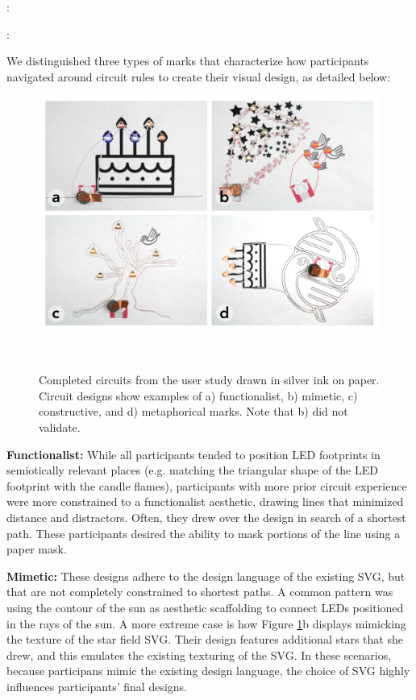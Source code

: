 \documentclass{sigchi}
\begin{document}
  : 
  
  
  : 

  We distinguished three types of marks that characterize how participants navigated around circuit rules to create their visual design, as detailed below:
  
  \begin{figure}[t]
\centering
  \includegraphics[width=1\columnwidth]{figures/users_final_des}
  \caption{Completed circuits from the user study drawn in silver ink on paper. Circuit designs show examples of a) functionalist, b) mimetic, c) constructive, and d) metaphorical marks. Note that b) did not validate.}~\label{fig:user-artwork}
  \vspace{-20pt}
\end{figure}

  \textbf{Functionalist:} While all participants tended to position LED footprints in semiotically relevant places (e.g. matching the triangular shape of the LED footprint with the candle flames), participants with more prior circuit experience were more constrained to a functionalist aesthetic, drawing lines that minimized distance and distractors. Often, they drew over the design in search of a shortest path. These participants desired the ability to mask portions of the line using a paper mask.


  \textbf{Mimetic:}
  These designs adhere to the design language of the existing SVG, but that are not completely constrained to shortest paths. A common pattern was using the contour of the sun as aesthetic scaffolding to connect LEDs positioned in the rays of the sun. A more extreme case is how Figure \ref{fig:user-artwork}b displays mimicking the texture of the star field SVG. Their design features additional stars that she drew, and this emulates the existing texturing of the SVG. In these scenarios, because participans mimic the existing design language, the choice of SVG highly influences participants' final designs.
  
\end{document}

